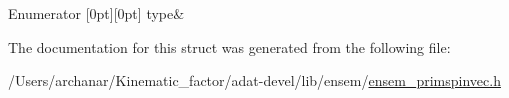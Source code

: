 \begin{DoxyEnumFields}{Enumerator}
[0pt][0pt]{}\mbox{\label{structENSEM_1_1EnsbcIO_3_01PSpinVector_3_01T_00_01N_01_4_01_4_ac42ea570df96d8856be4afb296460802a04e61fa5aa42066e9fedbcc4e35bc62d}} 
type&\\
\hline

\end{DoxyEnumFields}


The documentation for this struct was generated from the following file\+:\begin{DoxyCompactItemize}
\item 
/\+Users/archanar/\+Kinematic\+\_\+factor/adat-\/devel/lib/ensem/\mbox{\hyperlink{adat-devel_2lib_2ensem_2ensem__primspinvec_8h}{ensem\+\_\+primspinvec.\+h}}\end{DoxyCompactItemize}
